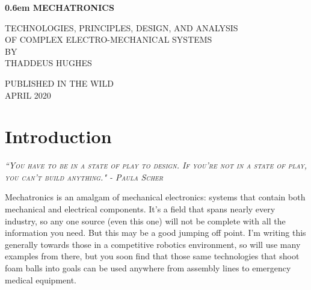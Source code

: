 \documentclass[10pt,letterpaper]{book}
\begin{document}
\clearpage
\newcommand\nbvspace[1][3]{\vspace*{\stretch{#1}}}
\newcommand\nbstretchyspace{\spaceskip0.5em plus 0.25em minus 0.25em}
\newcommand{\nbtitlestretch}{\spaceskip0.6em}
\pagestyle{plain}
\begin{center}
  \bfseries
  \nbvspace[1]
  \Huge
  {\nbtitlestretch\huge
    MECHATRONICS}

  \nbvspace[1]
  \normalsize
  TECHNOLOGIES, PRINCIPLES, DESIGN, AND ANALYSIS\\
  OF COMPLEX ELECTRO-MECHANICAL SYSTEMS\\
  
  \nbvspace[1]
  \small BY\\
  \Large THADDEUS HUGHES\\[0.5em]

  \nbvspace[2]

  \nbvspace[3]
  \normalsize

  \large
  PUBLISHED IN THE WILD \\
  \small APRIL 2020 \\
\end{center}


\raggedbottom

\tableofcontents

\chapter{Introduction}
 
 {\slshape \scshape ``You have to be in a state of play to design. If you're not in a state of play, you can't build anything." - Paula Scher}

Mechatronics is an amalgam of mechanical electronics: systems that contain both mechanical and electrical components. It's a field that spans nearly every industry, so any one source (even this one) will not be complete with all the information you need. But this may be a good jumping off point. I'm writing this generally towards those in a competitive robotics environment, so will use many examples from there, but you soon find that those same technologies that shoot foam balls into goals can be used anywhere from assembly lines to emergency medical equipment.
\end{document}

